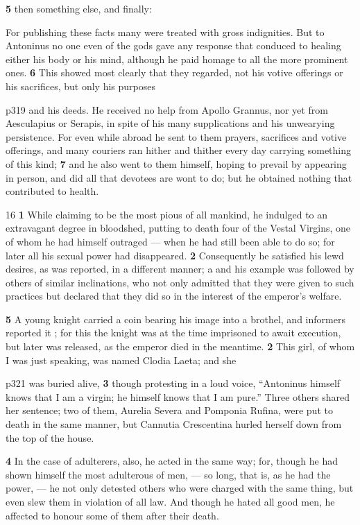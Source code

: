 \textbf{5} then something else, and finally:

For publishing these facts many were treated with gross indignities. But to Antoninus no one even of the gods gave any response that conduced to healing either his body or his mind, although he paid homage to all the more prominent ones. \textbf{6} This showed most clearly that they regarded, not his votive offerings or his sacrifices, but only his purposes

p319 and his deeds. He received no help from Apollo Grannus, nor yet from Aesculapius or Serapis, in spite of his many supplications and his unwearying persistence. For even while abroad he sent to them prayers, sacrifices and votive offerings, and many couriers ran hither and thither every day carrying something of this kind; \textbf{7} and he also went to them himself, hoping to prevail by appearing in person, and did all that devotees are wont to do; but he obtained nothing that contributed to health.

16
\textbf{1} While claiming to be the most pious of all mankind, he indulged to an extravagant degree in bloodshed, putting to death four of the Vestal Virgins, one of whom he had himself outraged \texthebrew{—} when he had still been able to do so; for later all his sexual power had disappeared. \textbf{2} Consequently he satisfied his lewd desires, as was reported, in a different manner;\texthebrew{⁠} a and his example was followed by others of similar inclinations, who not only admitted that they were given to such practices but declared that they did so in the interest of the emperor's welfare.

\textbf{5} A young knight carried a coin bearing his image into a brothel, and informers reported it ; for this the knight was at the time imprisoned to await execution, but later was released, as the emperor died in the meantime. \textbf{2} This girl, of whom I was just speaking, was named Clodia Laeta; and she

p321 was buried alive, \textbf{3} though protesting in a loud voice, ``Antoninus himself knows that I am a virgin; he himself knows that I am pure.'' Three others shared her sentence; two of them, Aurelia Severa and Pomponia Rufina, were put to death in the same manner, but Cannutia Crescentina hurled herself down from the top of the house.

\textbf{4} In the case of adulterers, also, he acted in the same way; for, though he had shown himself the most adulterous of men, \texthebrew{—} so long, that is, as he had the power, \texthebrew{—} he not only detested others who were charged with the same thing, but even slew them in violation of all law. And though he hated all good men, he affected to honour some of them after their death.

